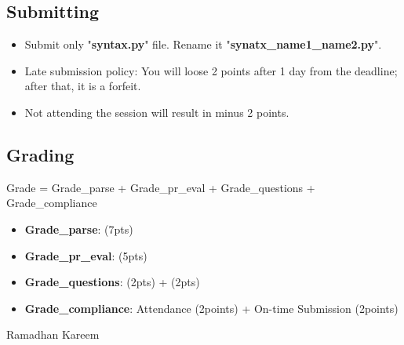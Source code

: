 \documentclass{../../../extra/aakpract/aakpract}
\begin{document}
\subsection{Submitting}

\begin{itemize}
	\item Submit only "\textbf{syntax.py}" file.
	Rename it "\textbf{synatx\_name1\_name2.py}".
	\item Late submission policy: You will loose 2 points after 1 day from the deadline; after that, it is a forfeit.
	\item Not attending the session will result in minus 2 points.
\end{itemize}

\subsection{Grading}

Grade = Grade\_parse + Grade\_pr\_eval + Grade\_questions + Grade\_compliance
	\begin{itemize}
		\item \textbf{Grade\_parse}: (7pts)
		\item \textbf{Grade\_pr\_eval}: (5pts)
		\item \textbf{Grade\_questions}: (2pts) + (2pts)
		\item \textbf{Grade\_compliance}: Attendance (2points) + On-time Submission (2points)
	\end{itemize}

\begin{flushright}
	Ramadhan Kareem
\end{flushright}
\end{document}
